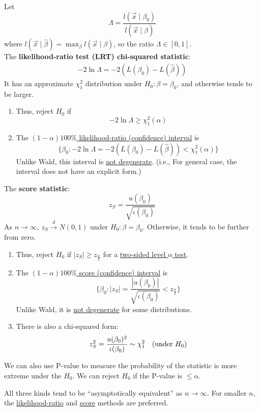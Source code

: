 \documentclass[11pt]{elegantbook}
\begin{document}
\begin{definition}
    Let $$\Lambda=\frac{l(\vec{x}\mid\beta_0)}{l(\vec{x}\mid\hat{\beta})}$$
    where $l(\vec{x}\mid\hat{\beta})=\max_{\beta}l(\vec{x}\mid\beta)$, so the ratio $\Lambda\in [0,1]$.\\
    The \textbf{likelihood-ratio test (LRT) chi-squared statistic}:
    \begin{equation}
        \begin{aligned}
            -2\ln\Lambda=-2\left(L(\beta_0)-L(\hat{\beta})\right)
        \end{aligned}
        \nonumber
    \end{equation}
    It has an approximate $\chi_1^2$ distribution under $H_0 : \beta = \beta_0$, and otherwise tends to be larger.
    \begin{enumerate}[(1)]
        \item Thus, reject $H_0$ if $$-2\ln\Lambda\geq\chi_1^2(\alpha)$$
        \item The \underline{$(1-\alpha)100\%$ likelihood-ratio (confidence) interval} is $$\{\beta_0:-2\ln\Lambda=-2\left(L(\beta_0)-L(\hat{\beta})\right)<\chi_1^2(\alpha)\}$$
        Unlike Wald, this interval is \underline{not degenerate}. (i.e., For general case, the interval does not have an explicit form.)
    \end{enumerate}
\end{definition}

\begin{definition}
    The \textbf{score statistic}: $$z_S=\frac{u(\beta_0)}{\sqrt{\iota(\beta_0)}}$$
    As $n \rightarrow \infty$, $z_S \stackrel{d}{\longrightarrow} N(0,1)$ under $H_0:\beta=\beta_0$. Otherwise, it tends to be further from zero.
    \begin{enumerate}[(1)]
        \item Thus, reject $H_0$ if $|z_S|\geq z_{\frac{\alpha}{2}}$ for a \underline{two-sided level $\alpha$ test}.
        \item The \underline{$(1-\alpha)100\%$ score (confidence) interval} is $$\{\beta_0:|z_S|=\frac{|u(\beta_0)|}{\sqrt{\iota(\beta_0)}}<z_{\frac{\alpha}{2}}\}$$
        Unlike Wald, it is \underline{not degenerate} for some distributions.
        \item There is also a chi-squared form:
        \begin{equation}
            \begin{aligned}
                z_S^2=\frac{u(\beta_0)^2}{\iota(\beta_0)}\sim \chi_1^2\quad \textnormal{(under $H_0$)}
            \end{aligned}
            \nonumber
        \end{equation}
    \end{enumerate}
\end{definition}
We can also use P-value to measure the probability of the statistic is more extreme under the $H_0$. We can reject $H_0$ if the P-value is $\leq\alpha$.

All three kinds tend to be “asymptotically equivalent” as $n \rightarrow \infty$. For smaller $n$, the \underline{likelihood-ratio} and \underline{score} methods are preferred.
\end{document}
